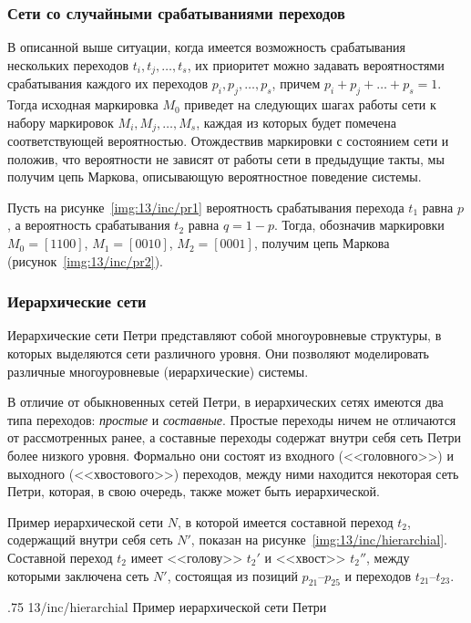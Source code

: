 \subsubsection{Сети со случайными срабатываниями переходов}

В описанной выше ситуации, когда имеется возможность срабатывания нескольких переходов ${t_i, t_j, \dots, t_s}$, их приоритет можно задавать вероятностями срабатывания каждого их переходов ${p_i, p_j, \dots, p_s}$, причем ${p_i + p_j + \dots + p_s = 1}$. Тогда исходная маркировка $M_0$ приведет на следующих шагах работы сети к набору маркировок ${M_i, M_j, \dots, M_s}$, каждая из которых будет помечена соответствующей вероятностью. Отождествив маркировки с состоянием сети и положив, что вероятности не зависят от работы сети в предыдущие такты, мы получим цепь Маркова, описывающую вероятностное поведение системы.

Пусть на рисунке~\ref{img:13/inc/pr1} вероятность срабатывания перехода $t_1$ равна $p$, а вероятность срабатывания $t_2$ равна ${q = 1 - p}$. Тогда, обозначив маркировки ${M_0 = [1100]}$, ${M_1 = [0010]}$, ${M_2 = [0001]}$, получим цепь Маркова (рисунок~\ref{img:13/inc/pr2}).

\subsubsection{Иерархические сети} 

Иерархические сети Петри представляют собой многоуровневые структуры, в которых выделяются сети различного уровня. Они позволяют моделировать различные многоуровневые (иерархические) системы.

В отличие от обыкновенных сетей Петри, в иерархических сетях имеются два типа переходов: \textit{простые} и \textit{составные}. Простые переходы ничем не отличаются от рассмотренных ранее, а составные переходы содержат внутри себя сеть Петри более низкого уровня. Формально они состоят из входного (<<головного>>) и выходного (<<хвостового>>) переходов, между ними находится некоторая сеть Петри, которая, в свою очередь, также может быть иерархической.

Пример иерархической сети $N$, в которой имеется составной переход $t_2$, содержащий внутри себя сеть $N'$, показан на рисунке~\ref{img:13/inc/hierarchial}. Составной переход $t_2$ имеет <<голову>> $t_2'$ и <<хвост>> $t_2''$, между которыми заключена сеть $N'$, состоящая из позиций $p_{21}$--$p_{25}$ и переходов $t_{21}$--$t_{23}$. 

\image
{.75\textwidth}
{13/inc/hierarchial}
{Пример иерархической сети Петри}


